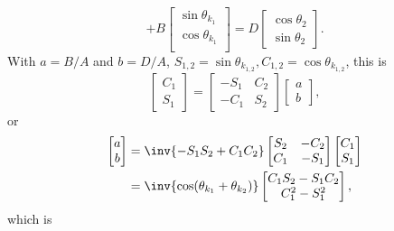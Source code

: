 \begin{enumerate}[(i)]
\begin{equation}
+
B
\begin{bmatrix}
\sin\theta_{k_1} \\
\cos\theta_{k_1} \\
\end{bmatrix}
=
D
\begin{bmatrix}
\cos \theta_2 \\
\sin \theta_2
\end{bmatrix}.
\end{equation}
%
With \( a = B/A \) and \( b = D/A \), \( S_{1,2} = \sin\theta_{k_{1,2}}, C_{1,2} = \cos\theta_{k_{1,2}} \), this is
%
\begin{equation}\label{eqn:gradQuantumProblemSet4Problem3:800}
\begin{bmatrix}
C_1 \\
S_1
\end{bmatrix}
=
\begin{bmatrix}
- S_1 & C_2 \\
- C_1 & S_2
\end{bmatrix}
\begin{bmatrix}
a \\
b
\end{bmatrix},
\end{equation}
%
or
\begin{equation}\label{eqn:gradQuantumProblemSet4Problem3:820}
\begin{aligned}
\begin{bmatrix}
a \\
b
\end{bmatrix}
&=
\inv{- S_1 S_2 + C_1 C_2 }
\begin{bmatrix}
S_2 & -C_2 \\
C_1 & -S_1
\end{bmatrix}
\begin{bmatrix}
C_1 \\
S_1
\end{bmatrix}
\\ &=
\inv{\cos(\theta_{k_1} + \theta_{k_2})}
\begin{bmatrix}
C_1 S_2 - S_1 C_2 \\
C_1^2 - S_1^2
\end{bmatrix},
\end{aligned}
\end{equation}
%
which is


\end{enumerate}

